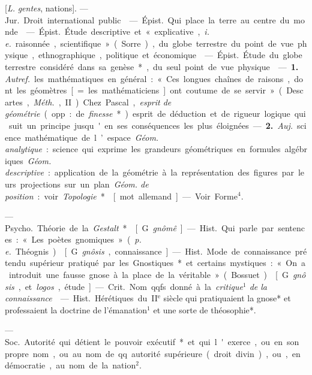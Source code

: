 \begin{itemize}[leftmargin=1cm, label=, itemsep=1pt]
 [{\it L.} {\it gentes}, nations].
— \si{Jur.} Droit international public.

 — \si{Épist.} Qui place la terre au centre du monde.

 — \si{Épist.} Étude descriptive et « explicative, {\it i. e.}
raisonnée, scientifique » (Sorre), du globe terrestre du point de vue
physique, ethnographique, politique et économique.

 — \si{Épist.} Étude du globe terrestre considéré dans sa
genèse*, du seul point de vue physique.

 — {\bf 1.} {\it Autref.} les mathématiques en général : « Ces
longues chaînes de raisons, dont les géomètres [= les mathématiciens] ont
coutume de se servir » (Descartes, {\it Méth.}, II). Chez Pascal,
{\it esprit de géométrie} (opp. : de {\it finesse}*) esprit de déduction et
de rigueur logique qui suit un principe jusqu'en ses conséquences les plus
éloignées. — {\bf 2.} {\it Auj.} science mathématique de l’espace.
{\it Géom. analytique} : science qui exprime les grandeurs géométriques en
formules algébriques. {\it Géom. descriptive} : application de la géométrie à
la représentation des figures par leurs projections sur un plan.
{\it Géom. de position} : voir {\it Topologie}*.

 [mot allemand]. — Voir Forme$^4$.

 — \si{Psycho.} Théorie de la {\it Gestalt}*.

 [G. {\it gnômê}]. — \si{Hist.} Qui parle par sentences : « Les
poètes gnomiques » ({\it p. e.} Théognis).

 [G. {\it gnôsis}, connaissance]. — \si{Hist.} Mode de connaissance
prétendu supérieur pratiqué par les Gnostiques* et certains mystiques : « On
a introduit une fausse gnose à la place de la véritable » (Bossuet).

 [G. {\it gnôsis}, et {\it logos}, étude].
— \si{Crit.} Nom qqfs. donné à la {\it critique$^1$ de la connaissance}.

 — \si{Hist.} Hérétiques du
{\footnotesize II}$^\text{e}$ siècle qui pratiquaient la gnose*
et professaient la doctrine de l’émanation$^1$ et une sorte de théosophie*.

 — \si{Soc.} Autorité qui détient le pouvoir exécutif* et
qui l'exerce, ou en son propre nom, ou au nom de qq. autorité supérieure
(droit divin), ou, en démocratie, au nom de la nation$^2$.


\end{itemize}
